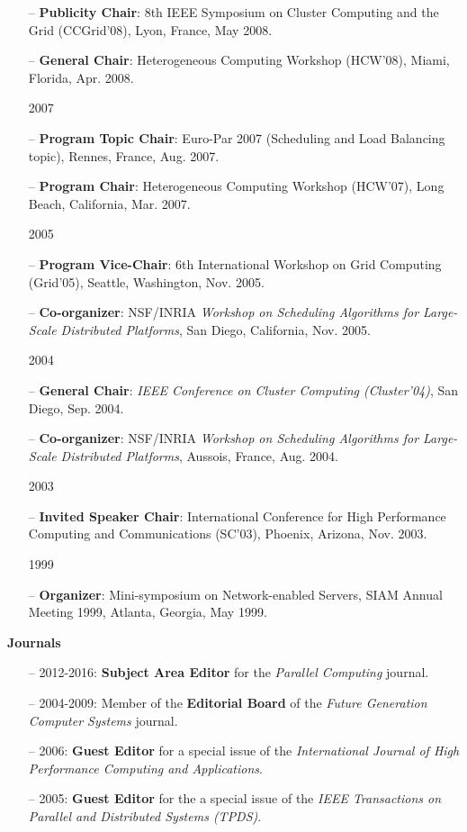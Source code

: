 \documentclass[times,11pt]{letter}
\begin{document}
\begin{itemize}
\item[--] {\bf Publicity Chair}: 8th IEEE Symposium on Cluster Computing and the Grid (CCGrid'08), Lyon, France, May 2008.
\item[--] {\bf General Chair}: Heterogeneous Computing Workshop (HCW'08), Miami, Florida, Apr. 2008.
\item [2007]
\item[--] {\bf Program Topic Chair}: Euro-Par 2007 (Scheduling and Load Balancing topic), Rennes, France, Aug. 2007.
\item[--] {\bf Program Chair}: Heterogeneous Computing Workshop (HCW'07), Long Beach, California, Mar. 2007.
\item [2005]
\item[--] {\bf Program Vice-Chair}: 6th International Workshop on Grid Computing (Grid'05), Seattle, Washington, Nov. 2005.
\item[--] {\bf Co-organizer}: NSF/INRIA \emph{Workshop on Scheduling Algorithms for Large-Scale Distributed Platforms}, San Diego, California, Nov. 2005.
\item [2004]
\item[--] {\bf General Chair}: \emph{IEEE Conference on Cluster Computing (Cluster'04)}, San Diego, Sep. 2004.
\item[--] {\bf Co-organizer}: NSF/INRIA \emph{Workshop on Scheduling Algorithms for Large-Scale Distributed Platforms}, Aussois, France, Aug. 2004.
\item [2003]
\item[--] {\bf Invited Speaker Chair}: International Conference for High Performance Computing and Communications (SC'03), Phoenix, Arizona, Nov. 2003.
\item [1999]
\item[--] {\bf Organizer}: Mini-symposium on Network-enabled Servers, SIAM Annual Meeting 1999, Atlanta, Georgia, May 1999.
\end{itemize}

\noindent
{\bf Journals}
\begin{itemize}
\item[--] 2012-2016: {\bf Subject Area Editor} for the \emph{Parallel Computing} journal.
\item[--] 2004-2009: Member of the {\bf Editorial Board} of the \emph{Future Generation Computer Systems} journal.
\item[--] 2006: {\bf Guest Editor} for a special issue of the \emph{International Journal of High Performance Computing and Applications}.
\item[--] 2005: {\bf Guest Editor} for the a special issue of the \emph{IEEE Transactions on Parallel and Distributed Systems (TPDS)}. 
\end{itemize}
\end{document}
